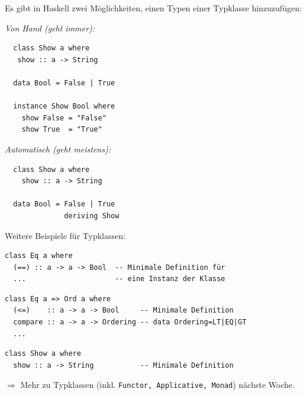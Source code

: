 \documentclass[unknownkeysallowed]{beamer}
\begin{document}
  
  \begin{frame}[fragile]
  
  Es gibt in Haskell zwei Möglichkeiten, einen Typen einer Typklasse hinzuzufügen:\pause  
  
  \begin{multicols}{2}
  \emph{Von Hand (geht immer):}
  
  \begin{verbatim}
  class Show a where
   show :: a -> String
  
  data Bool = False | True

  instance Show Bool where
    show False = "False"
    show True  = "True"
  \end{verbatim}
  
  \pause
  \columnbreak  
  \emph{Automatisch (geht meistens):}
  
  \begin{verbatim}
  class Show a where
    show :: a -> String  
  
  data Bool = False | True 
              deriving Show
  \end{verbatim}
  \end{multicols} 
  
\end{frame}


  \begin{frame}[fragile]
  
  Weitere Beispiele für Typklassen: \pause

  \begin{verbatim}
class Eq a where
  (==) :: a -> a -> Bool  -- Minimale Definition für
  ...                     -- eine Instanz der Klasse
  \end{verbatim}
  
  \pause
  
  \begin{verbatim}
class Eq a => Ord a where
  (<=)    :: a -> a -> Bool     -- Minimale Definition
  compare :: a -> a -> Ordering -- data Ordering=LT|EQ|GT
  ...
  \end{verbatim}
  
  \pause
  
  \begin{verbatim}
class Show a where
  show :: a -> String           -- Minimale Definition
  \end{verbatim}
  
  \pause
  
  $\Rightarrow$ Mehr zu Typklassen (inkl. \texttt{Functor, Applicative, Monad}) 
  nächste Woche.

\end{frame}
\end{document}
